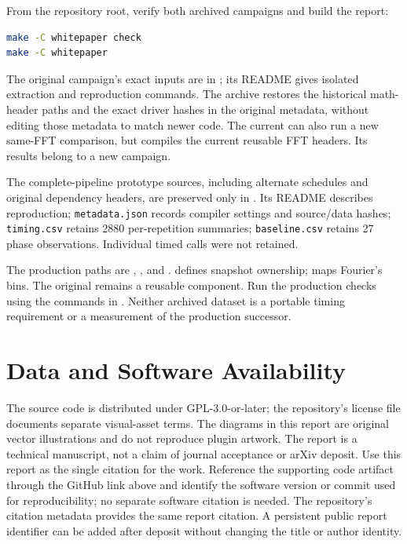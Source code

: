 \documentclass[11pt,letterpaper]{article}
\newcommand{\code}[1]{\texttt{#1}}
\begin{document}
From the repository root, verify both archived campaigns and build the report:
\begin{lstlisting}[language=bash]
make -C whitepaper check
make -C whitepaper
\end{lstlisting}
The original campaign's exact inputs are in
; its README gives isolated extraction and
reproduction commands. The archive restores the historical math-header paths
and the exact driver hashes in the original metadata, without editing those
metadata to match newer code. The current 
can also run a new same-FFT comparison, but compiles the current reusable FFT
headers. Its results belong to a new campaign.

The complete-pipeline prototype sources, including alternate schedules and
original dependency headers, are preserved only in
. Its README describes reproduction;
\code{metadata.json} records compiler settings and source/data hashes;
\code{timing.csv} retains 2880 per-repetition summaries; \code{baseline.csv}
retains 27 phase observations. Individual timed calls were not retained.

The production paths are ,
, and .
 defines snapshot ownership;
 maps Fourier's bins.
The original  remains a reusable component. Run the
production checks using the commands in
.
Neither archived dataset is a portable timing requirement or a measurement
of the production successor.

\section{Data and Software Availability}
The source code is distributed under GPL-3.0-or-later; the repository's license
file documents separate visual-asset terms. The diagrams in this report are
original vector illustrations and do not reproduce plugin artwork. The report
is a technical manuscript, not a claim of journal acceptance or arXiv deposit.
Use this report as the single citation for the work. Reference the supporting
code artifact through the GitHub link above and identify the software version
or commit used for reproducibility; no separate software citation is needed.
The repository's citation metadata provides the same report citation.
A persistent public report identifier can be added after deposit without
changing the title or author identity.
\end{document}
